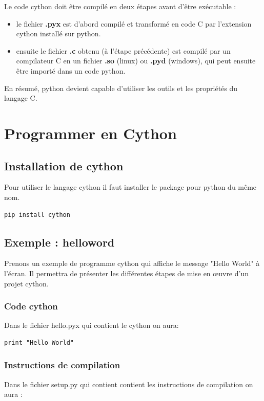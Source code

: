 Le code cython doit être compilé en deux étapes avant d'être exécutable : 
\begin{itemize}
\item le fichier \textbf{.pyx} est d'abord compilé et transformé en code C par l'extension cython installé sur python.
\item ensuite le fichier \textbf{.c} obtenu (à l'étape précédente) est compilé par un compilateur C en un fichier \textbf{.so} (linux) ou \textbf{.pyd} (windows), qui peut ensuite être importé dans un code python.
\end{itemize}

En résumé, python devient capable d'utiliser les outils et les propriétés du langage C. 

\section{Programmer en Cython}

\subsection{Installation de cython}

Pour utiliser le langage cython il faut installer le package pour python du même nom.

\begin{verbatim}
pip install cython
\end{verbatim}

\subsection{Exemple : helloword}

Prenons un exemple de programme cython qui affiche le message "Hello World" à l'écran. Il permettra de présenter les différentes étapes de mise en œuvre d'un projet cython.

\subsubsection{Code cython}
Dans le fichier hello.pyx qui contient le cython on aura:
\begin{verbatim}
print "Hello World"
\end{verbatim}


\subsubsection{Instructions de compilation}
Dans le fichier setup.py qui contient contient les instructions de compilation on aura :

